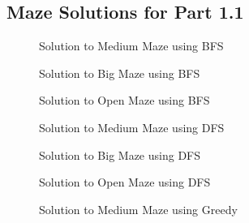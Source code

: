 \documentclass{article}[12pt]
\begin{document}
   \newpage
\begin{appendices}

\section{Maze Solutions for Part 1.1}
   \label{appendix:p11}
   
   \begin{figure}[!htb]
   \centering
   \caption{Solution to Medium Maze using BFS}
   \label{fig:bfs_medmaze}
   \end{figure}
   
   \begin{figure}[!htb]
   \centering
   \caption{Solution to Big Maze using BFS}
   \label{fig:bfs_bigmaze}
   \end{figure}
   
   \begin{figure}[!htb]
   \centering
   \caption{Solution to Open Maze using BFS}
   \label{fig:bfs_openmaze}
   \end{figure}
   
   \begin{figure}[!htb]
   \centering
   \caption{Solution to Medium Maze using DFS}
   \label{fig:dfs_medmaze}
   \end{figure}
   
   \begin{figure}[!htb]
   \centering
   \caption{Solution to Big Maze using DFS}
   \label{fig:dfs_bigmaze}
   \end{figure}
   
   \begin{figure}[!htb]
   \centering
   \caption{Solution to Open Maze using DFS}
   \label{fig:dfs_openmaze}
   \end{figure}
   
   \begin{figure}[!htb]
   \centering
   \caption{Solution to Medium Maze using Greedy}
   \label{fig:greedy_medmaze}
   \end{figure}
   

\end{appendices}
\end{document}
